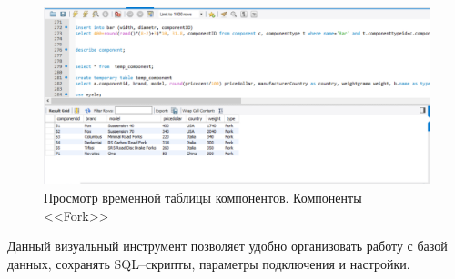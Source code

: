 \begin{figure}[h!]
	\centering
	\includegraphics[width=1\linewidth]{figures/web-clent/workbrench-forks}
	\caption{Просмотр временной таблицы компонентов. Компоненты <<Fork>>}
	\label{fig:workbrench-forks}
\end{figure}

Данный визуальный инструмент позволяет удобно организовать работу с базой данных, сохранять SQL--скрипты, параметры подключения и настройки.